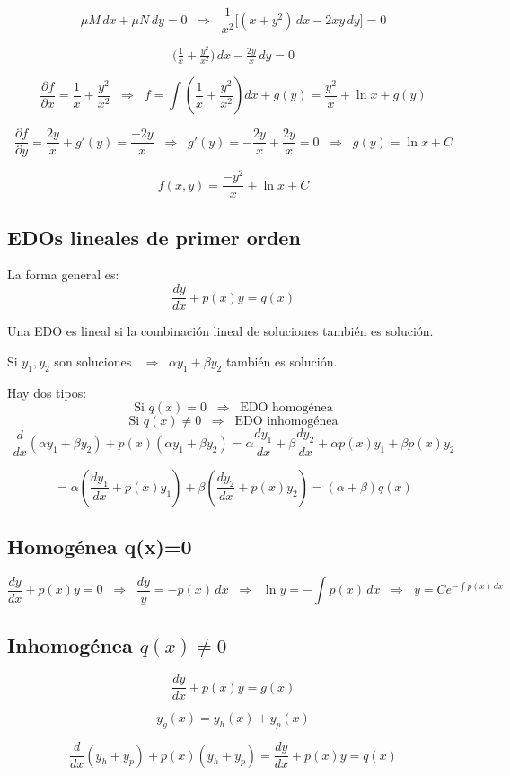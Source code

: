 \documentclass[a4paper,12pt]{article}
\begin{document}
\[
\mu M\,dx + \mu N\,dy = 0
\;\;\Rightarrow\;\;
\frac{1}{x^2}\big[(x+y^2)\,dx - 2xy\,dy\big]=0
\]

\[
\Big(\tfrac{1}{x}+\tfrac{y^2}{x^2}\Big)\,dx - \tfrac{2y}{x}\,dy=0
\]

\[
\frac{\partial f}{\partial x}=\frac{1}{x}+\frac{y^2}{x^2}
\;\;\Rightarrow\;\;
f=\int \left(\frac{1}{x}+\frac{y^2}{x^2}\right)dx + g(y)
= \frac{y^2}{x}+\ln x+g(y)
\]

\[
\frac{\partial f}{\partial y}=\frac{2y}{x}+g'(y)=\frac{-2y}{x}
\;\;\Rightarrow\;\;
g'(y)=-\frac{2y}{x}+\frac{2y}{x}=0
\;\;\Rightarrow\;\;
g(y)=\ln x+C
\]

\[
f(x,y)=\frac{-y^2}{x}+\ln x+C
\]

\subsection{EDOs lineales de primer orden}

La forma general es:
\[
\frac{dy}{dx}+p(x)y=q(x)
\]

Una EDO es lineal si la combinación lineal de soluciones también es solución.

Si $y_1,y_2$ son soluciones $\;\;\Rightarrow\;\;\alpha y_1+\beta y_2$ también es solución.

\medskip
Hay dos tipos:
\[
\text{Si } q(x)=0 \;\;\Rightarrow\;\; \text{EDO homogénea}
\]
\[
\text{Si } q(x)\neq 0 \;\;\Rightarrow\;\; \text{EDO inhomogénea}
\]
\[
\frac{d}{dx}(\alpha y_1 + \beta y_2) + p(x)(\alpha y_1 + \beta y_2) 
= \alpha \frac{dy_1}{dx} + \beta \frac{dy_2}{dx} + \alpha p(x)y_1 + \beta p(x)y_2
\]

\[
= \alpha\left(\frac{dy_1}{dx}+p(x)y_1\right)+\beta\left(\frac{dy_2}{dx}+p(x)y_2\right)
= (\alpha+\beta)q(x)
\]

\subsection{Homogénea q(x)=0}

\[
\frac{dy}{dx}+p(x)y=0
\;\;\Rightarrow\;\;
\frac{dy}{y}=-p(x)\,dx
\;\;\Rightarrow\;\;
\ln y = -\int p(x)\,dx
\;\;\Rightarrow\;\;
y=Ce^{-\int p(x)\,dx}
\]
\subsection{Inhomogénea $q(x)\neq 0$}
\[
\frac{dy}{dx}+p(x)y=g(x)
\]

\[
y_g(x)=y_h(x)+y_p(x)
\]

\[
\frac{d}{dx}(y_h+y_p)+p(x)(y_h+y_p)=\frac{dy}{dx}+p(x)y=q(x)
\]
\end{document}
